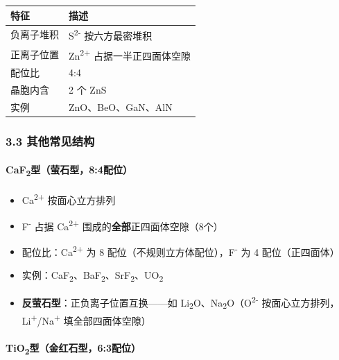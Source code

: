 \documentclass[a4paper,11pt]{ctexart}
\providecommand{\tightlist}{\setlength{\itemsep}{0pt}\setlength{\parskip}{0pt}}
\newcounter{none}
\begin{document}
{\def\LTcaptype{none} %
\begin{longtable}[]{@{}ll@{}}
\toprule\noalign{}
特征 & 描述 \\
\midrule\noalign{}
\endhead
\bottomrule\noalign{}
\endlastfoot
负离子堆积 & S\textsuperscript{2-} 按六方最密堆积 \\
正离子位置 & Zn\textsuperscript{2+} 占据一半正四面体空隙 \\
配位比 & 4:4 \\
晶胞内含 & 2 个 ZnS \\
实例 & ZnO、BeO、GaN、AlN \\
\end{longtable}
}

\subsubsection{3.3 其他常见结构}\label{ux5176ux4ed6ux5e38ux89c1ux7ed3ux6784}

\paragraph{\texorpdfstring{CaF\textsubscript{2}型（萤石型，8:4配位）}{CaF2型（萤石型，8:4配位）}}\label{caf2ux578bux8424ux77f3ux578b84ux914dux4f4d}

\begin{itemize}
\tightlist
\item
  Ca\textsuperscript{2+} 按面心立方排列
\item
  F\textsuperscript{-} 占据 Ca\textsuperscript{2+} 围成的\textbf{全部}正四面体空隙（8个）
\item
  配位比：Ca\textsuperscript{2+} 为 8 配位（不规则立方体配位），F\textsuperscript{-} 为 4 配位（正四面体）
\item
  实例：CaF\textsubscript{2}、BaF\textsubscript{2}、SrF\textsubscript{2}、UO\textsubscript{2}
\item
  \textbf{反萤石型}：正负离子位置互换------如 Li\textsubscript{2}O、Na\textsubscript{2}O（O\textsuperscript{2-} 按面心立方排列，Li\textsuperscript{+}/Na\textsuperscript{+} 填全部四面体空隙）
\end{itemize}

\paragraph{\texorpdfstring{TiO\textsubscript{2}型（金红石型，6:3配位）}{TiO2型（金红石型，6:3配位）}}\label{tio2ux578bux91d1ux7ea2ux77f3ux578b63ux914dux4f4d}
\end{document}
